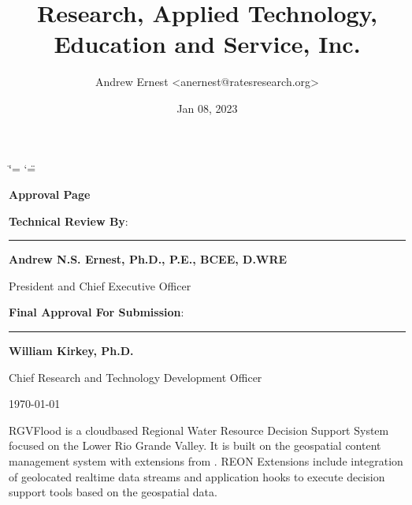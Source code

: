 \documentclass[letterpaper,12pt,english,openany,oneside]{sphinxmanual}
\title{Research, Applied Technology, Education and Service, Inc.}
\date{Jan 08, 2023}
\author{Andrew Ernest <anernest@ratesresearch.org>}
\begin{document}
\ifdefined\shorthandoff
  \ifnum\catcode`\=\string=\active\shorthandoff{=}\fi
  \ifnum\catcode`\"=\active{}\fi
\fi

\pagestyle{empty}
 
\sphinxmaketitle
    \newcommand\signature[3]{%
    {\sffamily
    \vspace{1cm}\par
    \textbf{#1}:\par
        \begin{minipage}{10cm}
        \centering
        \vspace{3cm}\par
        \rule{10cm}{1pt}\par
        \textbf{#2}\par
        #3%
        \end{minipage}
    }
    }
    \newcommand\insertdate[1][\today]{\vfill\begin{flushright}#1\end{flushright}}
    {\LARGE\sffamily \textbf{Approval Page}}
    
    \signature{Technical Review By}{Andrew N.S. Ernest, Ph.D., P.E., BCEE, D.WRE}{President and Chief Executive Officer}
    
    \signature{Final Approval For Submission}{William Kirkey, Ph.D.}{Chief Research and Technology Development Officer}
        
    \insertdate

\pagestyle{plain}
\sphinxtableofcontents
\pagestyle{normal}
\label{\detokenize{index::doc}}


\sphinxAtStartPar
RGVFlood is a cloud\sphinxhyphen{}based Regional Water Resource Decision Support System focused on the Lower Rio Grande Valley. It is built on the  geospatial content management system with extensions from . REON Extensions include integration of geolocated real\sphinxhyphen{}time data streams and application hooks to execute decision support tools based on the geospatial data.

\sphinxstepscope
\end{document}
